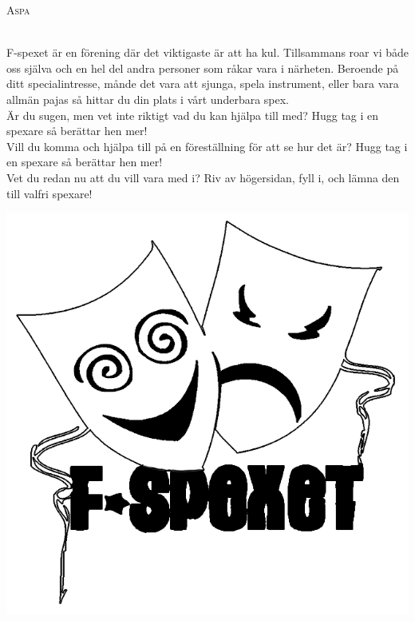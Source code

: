 \setlength{\columnsep}{0.6cm}
\setlength{\columnseprule}{0.2pt}
\begin{multicols}{2}
    {\centerline{\Huge \textsc{Aspa}}}\leavevmode\\
    \noindent F-spexet är en förening där det viktigaste är att ha kul. Tillsammans roar vi både oss själva och en hel del andra personer som råkar vara i närheten. Beroende på ditt specialintresse, månde det vara att sjunga, spela instrument, eller bara vara allmän pajas så hittar du din plats i vårt underbara spex.\leavevmode\\
    
    \noindent Är du sugen, men vet inte riktigt vad du kan hjälpa till med? Hugg tag i en spexare så berättar hen mer!\leavevmode\\
    
    \noindent Vill du komma och hjälpa till på en föreställning för att se hur det är? Hugg tag i en spexare så berättar hen mer!\leavevmode\\
    
    \noindent Vet du redan nu att du vill vara med i? Riv av högersidan, fyll i, och lämna den till valfri spexare!

    \vspace*{\baselineskip}
    {\hfill }\vfill

    \centering
    \includegraphics[width=\columnwidth]{Bilder/Loggor/Spexloggaoifylld3.png}
    

\end{multicols}
